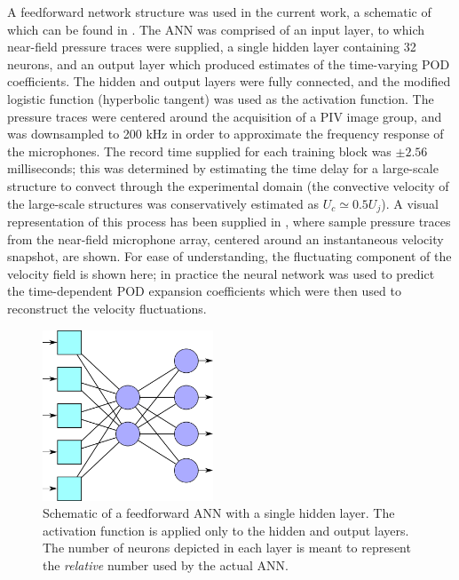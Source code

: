 A feedforward network structure was used in the current work, a schematic of which can be found in .
The ANN was comprised of an input layer, to which near-field pressure traces were supplied, a single hidden layer containing 32 neurons, and an output layer which produced estimates of the time-varying POD coefficients. 
The hidden and output layers were fully connected, and the modified logistic function (hyperbolic tangent) was used as the activation function.
The pressure traces were centered around the acquisition of a PIV image group, and was downsampled to 200 kHz in order to approximate the frequency response of the microphones.
The record time supplied for each training block was $\pm 2.56$ milliseconds; this was determined by estimating the time delay for a large-scale structure to convect through the experimental domain (the convective velocity of the large-scale structures was conservatively estimated as $U_c \simeq 0.5 U_j$).
A visual representation of this process has been supplied in , where sample pressure traces from the near-field microphone array, centered around an instantaneous velocity snapshot, are shown.
For ease of understanding, the fluctuating component of the velocity field is shown here; in practice the neural network was used to predict the time-dependent POD expansion coefficients which were then used to reconstruct the velocity fluctuations.
\begin{figure}
	\centering
	\includegraphics[width = 2in]{Figures/neural_net_v2.png}
	\caption{Schematic of a feedforward ANN with a single hidden layer. The activation function is applied only to the hidden and output layers. The number of neurons depicted in each layer is meant to represent the \textit{relative} number used by the actual ANN.}
	\label{fig:ch4_neural_net}
\end{figure} 

